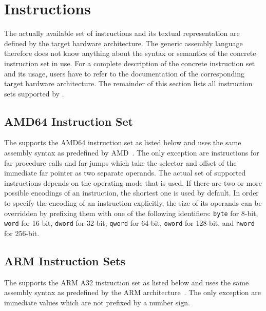 \section{Instructions}\label{sec:asminstructions}

The actually available set of instructions and its textual representation are defined by the target hardware architecture.
The generic assembly language therefore does not know anything about the syntax or semantics of the concrete instruction set in use.
For a complete description of the concrete instruction set and its usage, users have to refer to the documentation of the corresponding target hardware architecture.
The remainder of this section lists all instruction sets supported by \ecs{}.

\renewcommand{\instruction}[2]{\pdftooltip{\texttt{#1}}{#2}\space}
\renewcommand{\instructionset}[1]{\begin{quote}\sloppy\footnotesize\end{quote}}

\subsection{AMD64 Instruction Set}

The \ecs{} supports the AMD64 instruction set as listed below and uses the same assembly syntax as predefined by AMD~\cite{amd64:volume3,amd64:volume4,amd64:volume5}.
The only exception are instructions for far procedure calls and far jumps which take the selector and offset of the immediate far pointer as two separate operands.
The actual set of supported instructions depends on the operating mode that is used.
If there are two or more possible encodings of an instruction, the shortest one is used by default.
In order to specify the encoding of an instruction explicitly, the size of its operands can be overridden by prefixing them with one of the following identifiers:
\texttt{byte} for 8-bit, \texttt{word} for 16-bit, \texttt{dword} for 32-bit, \texttt{qword} for 64-bit, \texttt{oword} for 128-bit, and \texttt{hword} for 256-bit.
\seeamd

\instructionset{amd64}

\subsection{ARM Instruction Sets}

The \ecs{} supports the ARM A32 instruction set as listed below and uses the same assembly syntax as predefined by the ARM architecture~\cite{arm:instructionset}.
The only exception are immediate values which are not prefixed by a number sign.
\seearm

